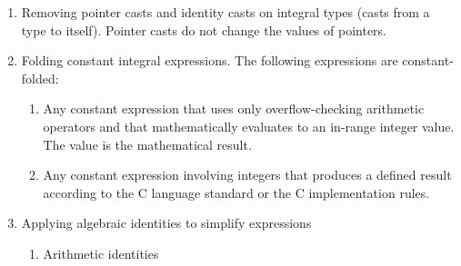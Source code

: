 \documentclass[]{article}
\begin{document}
\begin{enumerate}
\def\labelenumi{\arabic{enumi}.}
\item
  Removing pointer casts and identity casts on integral types (casts
  from a type to itself). Pointer casts do not change the values of
  pointers.
\item
  Folding constant integral expressions. The following expressions are
  constant-folded:

  \begin{enumerate}
  \def\labelenumii{\alph{enumii}.}
  \item
    Any constant expression that uses only overflow-checking arithmetic
    operators and that mathematically evaluates to an in-range integer
    value. The value is the mathematical result.
  \item
    Any constant expression involving integers that produces a defined
    result according to the C language standard or the C implementation
    rules.
  \end{enumerate}
\item
  Applying algebraic identities to simplify expressions

  \begin{enumerate}
  \def\labelenumii{\alph{enumii}.}
  \item
    Arithmetic identities


\end{enumerate}
\end{enumerate}
\end{document}
